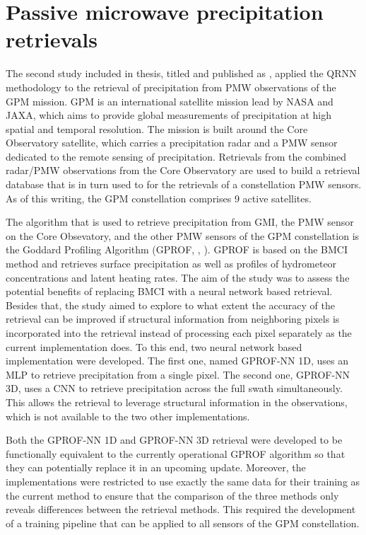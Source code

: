 \section{Passive microwave precipitation retrievals}

The second study included in thesis, titled  and published as \citet{pfreundschuh22a}, applied the QRNN methodology to
the retrieval of precipitation from PMW observations of the GPM mission.
GPM  is an international satellite mission lead by NASA and JAXA, which aims
to provide global measurements of precipitation at high spatial and temporal
resolution. The mission is built around the Core Observatory satellite, which
carries a precipitation radar and a PMW sensor dedicated to
the remote sensing of precipitation. Retrievals from the combined radar/PMW
observations from the Core Observatory are used to build a retrieval
database that is in turn used to for the retrievals of a constellation 
PMW sensors. As of this writing, the GPM constellation comprises 9 active
satellites.

The algorithm that is used to retrieve precipitation from GMI, the PMW sensor on
the Core Obsevatory, and the other PMW sensors of the GPM constellation is the
Goddard Profiling Algorithm (GPROF, \citeauthor{kummerow15},
\citeyear{kummerow15}). GPROF is based on the BMCI method and retrieves surface
precipitation as well as profiles of hydrometeor concentrations and latent
heating rates. The aim of the study was to assess the potential benefits of
replacing BMCI with a neural network based retrieval. Besides that, the study
aimed to explore to what extent the accuracy of the retrieval can be improved if
structural information from neighboring pixels is incorporated into the
retrieval instead of processing each pixel separately as the current
implementation does. To this end, two neural network based implementation were
developed. The first one, named GPROF-NN 1D, uses an MLP to retrieve
precipitation from a single pixel. The second one, GPROF-NN 3D, uses a CNN to
retrieve precipitation across the full swath simultaneously. This allows the
retrieval to leverage structural information in the observations, which is not
available to the two other implementations.

Both the GPROF-NN 1D and GPROF-NN 3D retrieval were developed to be functionally
equivalent to the currently operational GPROF algorithm so that they can
potentially replace it in an upcoming update. Moreover, the implementations were
restricted to use exactly the same data for their training as the current method
to ensure that the comparison of the three methods only reveals differences
between the retrieval methods. This required the development of a training
pipeline that can be applied to all sensors of the GPM constellation.

